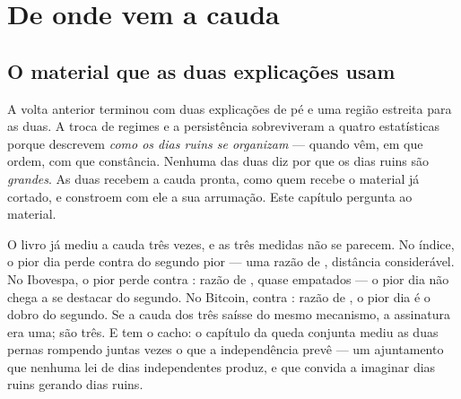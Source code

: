 %
%

\chapter{De onde vem a cauda}
\label{cap:cauda}

\section{O material que as duas explicações usam}

A volta anterior terminou com duas explicações de pé e uma região estreita para as duas. A troca de
regimes e a persistência sobreviveram a quatro estatísticas porque descrevem \emph{como os dias
ruins se organizam} --- quando vêm, em que ordem, com que constância. Nenhuma das duas diz por que
os dias ruins são \emph{grandes}. As duas recebem a cauda pronta, como quem recebe o material já
cortado, e constroem com ele a sua arrumação. Este capítulo pergunta ao material.

O livro já mediu a cauda três vezes, e as três medidas não se parecem. No índice, o pior dia perde
\numRecordeIndicePior{} contra \numRecordeIndiceSegundo{} do segundo pior --- uma razão de
\numRecordeIndiceRazao{}, distância considerável. No Ibovespa, o pior perde \numRecordeIbovespaPior{}
contra \numRecordeIbovespaSegundo{}: razão de \numRecordeIbovespaRazao{}, quase empatados --- o
pior dia não chega a se destacar do segundo. No Bitcoin, \numRecordeBitcoinPior{} contra
\numRecordeBitcoinSegundo{}: razão de \numRecordeBitcoinRazao{}, o pior dia é o dobro do segundo.
Se a cauda dos três saísse do mesmo mecanismo, a assinatura era uma; são três. E tem o cacho: o
capítulo da queda conjunta mediu as duas pernas rompendo juntas \numConjuntaExcesso{} vezes o que
a independência prevê --- um ajuntamento que nenhuma lei de dias independentes produz, e que
convida a imaginar dias ruins gerando dias ruins.

